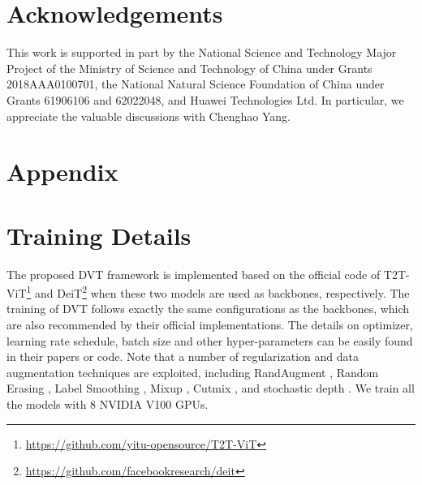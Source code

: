 \documentclass{article}
\begin{document}
%
 
\vspace{-1.5ex}
\section*{Acknowledgements}
\vspace{-1.5ex}
This work is supported in part by the National Science and Technology Major Project of the Ministry of Science and Technology of China under Grants 2018AAA0100701, the National Natural Science Foundation of China under Grants 61906106 and 62022048, and Huawei Technologies Ltd. In particular, we appreciate the valuable discussions with Chenghao Yang.









\newpage
\appendix
\section*{Appendix}

\section{Training Details}

The proposed DVT framework is implemented based on the official code of T2T-ViT\footnote{\url{https://github.com/yitu-opensource/T2T-ViT}} \cite{yuan2021tokens} and DeiT\footnote{\url{https://github.com/facebookresearch/deit}} \cite{touvron2020training} when these two models are used as backbones, respectively. The training of DVT follows exactly the same configurations as the backbones, which are also recommended by their official implementations. The details on optimizer, learning rate schedule, batch size and other hyper-parameters can be easily found in their papers or code. Note that a number of regularization and data augmentation techniques are exploited, including RandAugment \cite{cubuk2020randaugment}, Random Erasing \cite{zhong2020random}, Label Smoothing \cite{szegedy2016rethinking}, Mixup \cite{zhang2018mixup}, Cutmix \cite{yun2019cutmix}, and stochastic depth \cite{huang2016deep}. We train all the models with 8 NVIDIA V100 GPUs.
\end{document}
